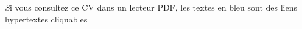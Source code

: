 \documentclass[
  paper=a4,
  fontsize=10pt
]{resume}
\begin{document}
\newpage
\sidebar{
	\vspace{3em}
	\hfill
}%
\mainbar{
	\vspace{3em}
	
	
	
	
	
}

\begin{center}
	\vfill
	\scriptsize
	{
		\textit
		Si vous consultez ce CV dans un lecteur PDF, {\color{blue-800}les textes en
				bleu} sont des liens hypertextes cliquables
	}
\end{center}

\let\cleardoublepage\clearpage
\end{document}
